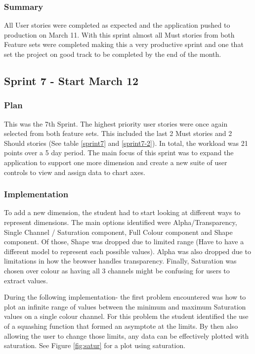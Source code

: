 \subsubsection{Summary}
All User stories were completed as expected and the application pushed to production on March 11. With this sprint almost all Must stories from both Feature sets were completed making this a very productive sprint and one that set the project on good track to be completed by the end of the month.

\subsection{Sprint 7 - Start March 12}
\subsubsection{Plan}
This was the 7th Sprint. The highest priority user stories were once again selected from both feature sets. This included the last 2 Must stories and 2 Should stories (See table \ref{sprint7} and \ref{sprint7-2}). In total, the workload was 21 points over a 5 day period. The main focus of this sprint was to expand the application to support one more dimension and create a new suite of user controls to view and assign data to chart axes.

\subsubsection{Implementation}
To add a new dimension, the student had to start looking at different ways to represent dimensions. The main options identified were Alpha/Transparency, Single Channel / Saturation component, Full Colour component and Shape component.
Of those, Shape was dropped due to limited range (Have to have a different model to represent each possible values). Alpha was also dropped due to limitations in how the browser handles transparency. Finally, Saturation was chosen over colour as having all 3 channels might be confusing for users to extract values.

During the following implementation- the first problem encountered was how to plot an infinite range of values between the minimum and  maximum Saturation values on a single colour channel. For this problem the student identified the use of a squashing function that formed an asymptote at the limits. By then also allowing the user to change those limits, any data can be effectively plotted with saturation. See Figure \ref{fig:satur} for a plot using saturation.

